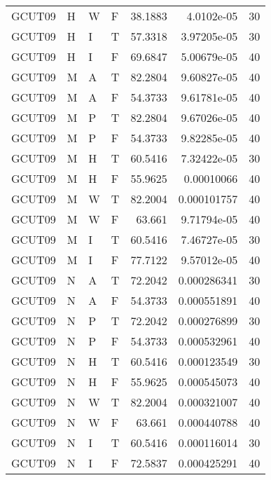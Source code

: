 \begin{table}[!htb]
{\begin{tabular}{llllrrr}
            GCUT09   & H     & W     & F          & 38.1883    & 4.0102e-05  & 30       \\
            GCUT09   & H     & I     & T          & 57.3318    & 3.97205e-05 & 30       \\
            GCUT09   & H     & I     & F          & 69.6847    & 5.00679e-05 & 40       \\
            GCUT09   & M     & A     & T          & 82.2804    & 9.60827e-05 & 40       \\
            GCUT09   & M     & A     & F          & 54.3733    & 9.61781e-05 & 40       \\
            GCUT09   & M     & P     & T          & 82.2804    & 9.67026e-05 & 40       \\
            GCUT09   & M     & P     & F          & 54.3733    & 9.82285e-05 & 40       \\
            GCUT09   & M     & H     & T          & 60.5416    & 7.32422e-05 & 30       \\
            GCUT09   & M     & H     & F          & 55.9625    & 0.00010066  & 40       \\
            GCUT09   & M     & W     & T          & 82.2004    & 0.000101757 & 40       \\
            GCUT09   & M     & W     & F          & 63.661     & 9.71794e-05 & 40       \\
            GCUT09   & M     & I     & T          & 60.5416    & 7.46727e-05 & 30       \\
            GCUT09   & M     & I     & F          & 77.7122    & 9.57012e-05 & 40       \\
            GCUT09   & N     & A     & T          & 72.2042    & 0.000286341 & 30       \\
            GCUT09   & N     & A     & F          & 54.3733    & 0.000551891 & 40       \\
            GCUT09   & N     & P     & T          & 72.2042    & 0.000276899 & 30       \\
            GCUT09   & N     & P     & F          & 54.3733    & 0.000532961 & 40       \\
            GCUT09   & N     & H     & T          & 60.5416    & 0.000123549 & 30       \\
            GCUT09   & N     & H     & F          & 55.9625    & 0.000545073 & 40       \\
            GCUT09   & N     & W     & T          & 82.2004    & 0.000321007 & 40       \\
            GCUT09   & N     & W     & F          & 63.661     & 0.000440788 & 40       \\
            GCUT09   & N     & I     & T          & 60.5416    & 0.000116014 & 30       \\
            GCUT09   & N     & I     & F          & 72.5837    & 0.000425291 & 40       \\
            \hline
        \end{tabular}
    }{}
\end{table}